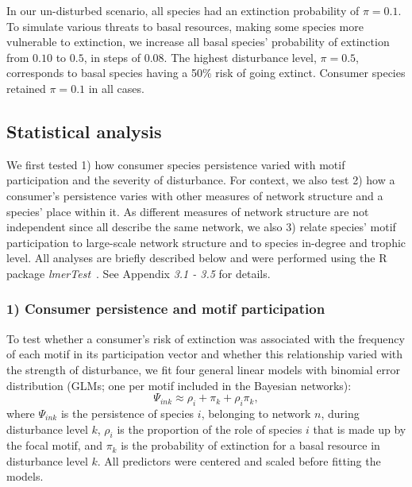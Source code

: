\documentclass[12pt]{article}
\begin{document}
\begin{spacing}{2.0}
            In our un-disturbed scenario, all species had an extinction probability of $\pi = 0.1$. 
            To simulate various threats to basal resources, making some species more vulnerable to extinction, we increase all basal species' probability of extinction from $0.10$ to $0.5$, in steps of $0.08$. 
            The highest disturbance level, $\pi = 0.5$, corresponds to basal species having a 50\% risk of going extinct. 
            Consumer species retained $\pi=0.1$ in all cases.


	\subsection*{Statistical analysis} 

        We first tested 1) how consumer species persistence varied with motif participation and the severity of disturbance.
        For context, we also test 2) how a consumer's persistence varies with other measures of network structure and a species' place within it.
        As different measures of network structure are not independent since all describe the same network, we also 3) relate species' motif participation to large-scale network structure and to species in-degree and trophic level.
        All analyses are briefly described below and were performed using the R~\citep{R} package \emph{lmerTest}~\citep{lmerTest}.
        See Appendix \emph{3.1 - 3.5} for details. 

        
        \subsubsection*{1) Consumer persistence and motif participation}

            To test whether a consumer's risk of extinction was associated with the frequency of each motif in its participation vector and whether this relationship varied with the strength of disturbance, we fit four general linear models with binomial error distribution (GLMs; one per motif included in the Bayesian networks):
            \begin{equation}
            \Psi_{ink} \approx \rho_{i} + \pi_{k} + \rho_{i}\pi_{k} ,
            \label{propreq}
            \end{equation}
            \noindent where $\Psi_{ink}$ is the persistence of species $i$, belonging to network $n$, during disturbance level $k$, $\rho_{i}$ is the proportion of the role of species $i$ that is made up by the focal motif, and $\pi_k$ is the probability of extinction for a basal resource in disturbance level $k$.
            All predictors were centered and scaled before fitting the models.         


\end{spacing}
\end{document}
